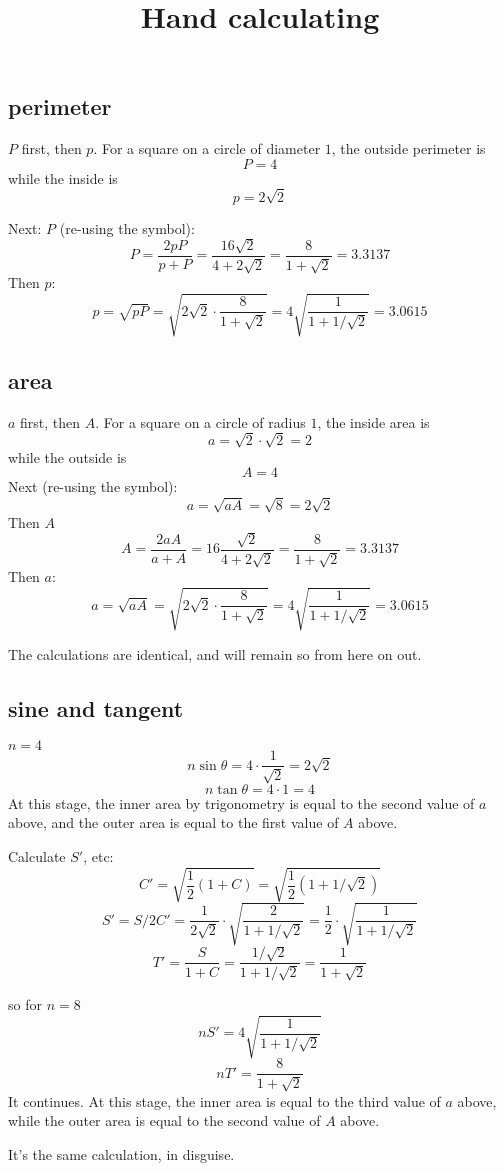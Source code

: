 \documentclass[11pt, oneside]{article}
\title{Hand calculating}
\date{}
\begin{document}
\maketitle
\Large

\subsection*{perimeter}
$P$ first, then $p$.  For a square on a circle of diameter $1$, the outside perimeter is
\[ P = 4 \]
while the inside is
\[ p = 2 \sqrt{2} \]

Next:  $P$ (re-using the symbol):
\[ P = \frac{2pP}{p+P} = \frac{16 \sqrt{2}}{4 + 2 \sqrt{2}} = \frac{8}{1 + \sqrt{2}} = 3.3137 \]
Then $p$:
\[ p = \sqrt{pP} = \sqrt{2 \sqrt{2} \cdot \frac{8}{1 + \sqrt{2}}} = 4 \sqrt{\frac{1}{1 +1/ \sqrt{2}}} = 3.0615  \]

\subsection*{area}
$a$ first, then $A$.  For a square on a circle of radius $1$, the inside area is
\[ a = \sqrt{2} \cdot \sqrt{2} = 2 \]
while the outside is 
\[ A = 4 \]
Next (re-using the symbol):
\[ a = \sqrt{aA} = \sqrt{8} = 2 \sqrt{2} \]
Then $A$
\[ A = \frac{2aA}{a + A} = 16 \frac{\sqrt{2} }{4 + 2 \sqrt{2}} = \frac{8}{1 + \sqrt{2}} = 3.3137 \]
Then $a$:
\[ a = \sqrt{aA} = \sqrt{2 \sqrt{2} \cdot \frac{8}{1 + \sqrt{2}}} = 4 \sqrt{\frac{1}{1 +1/ \sqrt{2}}} = 3.0615  \]

The calculations are identical, and will remain so from here on out.

\subsection*{sine and tangent}
$n=4$
\[ n \sin \theta = 4 \cdot \frac{1}{\sqrt{2}} = 2 \sqrt{2} \]
\[ n \tan \theta = 4 \cdot 1 = 4 \]
At this stage, the inner area by trigonometry is equal to the second value of $a$ above, and the outer area is equal to the first value of $A$ above.

Calculate $S'$, etc:
\[ C' = \sqrt{\frac{1}{2} (1 + C)} = \sqrt{\frac{1}{2} (1 + 1/\sqrt{2}) } \]
\[ S' = S/2C' = \frac{1}{2 \sqrt{2}} \cdot \sqrt{\frac{2}{1 + 1/\sqrt{2}}} = \frac{1}{2} \cdot \sqrt{\frac{1}{1 + 1/\sqrt{2}}} \]
\[ T' = \frac{S}{1 + C} = \frac{1/\sqrt{2}}{1 + 1/\sqrt{2}} = \frac{1}{1 + \sqrt{2}} \]

so for $n=8$
\[ n S' = 4 \sqrt{\frac{1}{1 + 1/\sqrt{2}}} \]
\[ n T' = \frac{8}{1 + \sqrt{2}} \]
It continues.  At this stage, the inner area is equal to the third value of $a$ above, while the outer area is equal to the second value of $A$ above.

It's the same calculation, in disguise.
\end{document}
